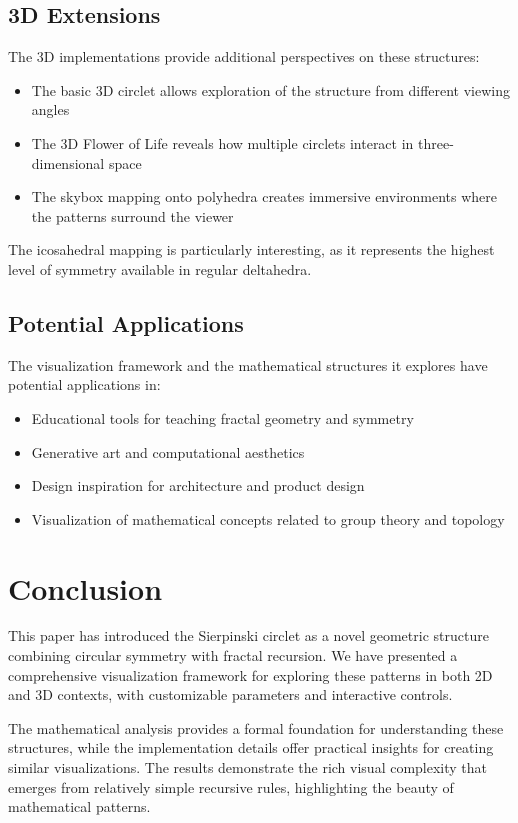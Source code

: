 \documentclass[12pt,a4paper]{article}
\begin{document}
\subsection{3D Extensions}
The 3D implementations provide additional perspectives on these structures:

\begin{itemize}
    \item The basic 3D circlet allows exploration of the structure from different viewing angles
    \item The 3D Flower of Life reveals how multiple circlets interact in three-dimensional space
    \item The skybox mapping onto polyhedra creates immersive environments where the patterns surround the viewer
\end{itemize}

The icosahedral mapping is particularly interesting, as it represents the highest level of symmetry available in regular deltahedra.

\subsection{Potential Applications}
The visualization framework and the mathematical structures it explores have potential applications in:

\begin{itemize}
    \item Educational tools for teaching fractal geometry and symmetry
    \item Generative art and computational aesthetics
    \item Design inspiration for architecture and product design
    \item Visualization of mathematical concepts related to group theory and topology
\end{itemize}

\section{Conclusion}
This paper has introduced the Sierpinski circlet as a novel geometric structure combining circular symmetry with fractal recursion. We have presented a comprehensive visualization framework for exploring these patterns in both 2D and 3D contexts, with customizable parameters and interactive controls.

The mathematical analysis provides a formal foundation for understanding these structures, while the implementation details offer practical insights for creating similar visualizations. The results demonstrate the rich visual complexity that emerges from relatively simple recursive rules, highlighting the beauty of mathematical patterns.
\end{document}
